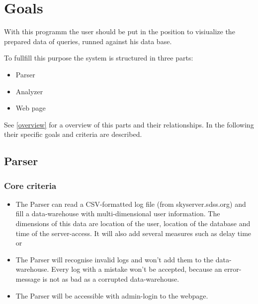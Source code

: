 \section{Goals}


With this programm the user should be put in the position 
to visiualize the prepared data of queries, runned against his data base.


To fullfill this purpose the system is structured in three parts:
\begin{itemize}
  \item Parser
  \item Analyzer
  \item Web page
\end{itemize}
See \ref{overview} for a overview of this parts and their relationships.
In the following their specific goals and criteria are described.




























\subsection{Parser}

\subsubsection{Core criteria} %
\begin{itemize}
\item The Parser can read a CSV-formatted log file (from skyserver.sdss.org)
 and fill a data-warehouse with multi-dimensional user information.
 The dimensions of this data are location of the user, location of the 
 database and time of the server-access. It will also add several measures such as delay time or  
\item The Parser will recognise invalid logs and won't add them to the data-warehouse.
 Every log with a mistake won't be accepted, because an error-message is not 
 as bad as a corrupted data-warehouse. 
\item The Parser will be accessible with admin-login to the webpage.
\end{itemize} 

